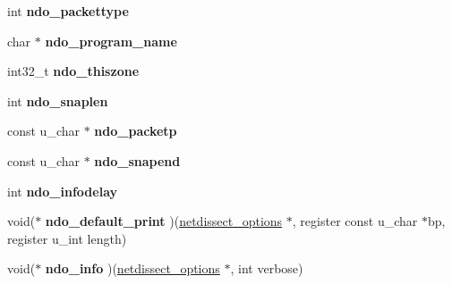 \begin{DoxyCompactItemize}
\item 
\hypertarget{structnetdissect__options_ada6900e4d98e413f6701f67e657f285d}{
int {\bfseries ndo\_\-packettype}}
\label{structnetdissect__options_ada6900e4d98e413f6701f67e657f285d}

\item 
\hypertarget{structnetdissect__options_a22c0eeff51bbc707974784deae68a89f}{
char $\ast$ {\bfseries ndo\_\-program\_\-name}}
\label{structnetdissect__options_a22c0eeff51bbc707974784deae68a89f}

\item 
\hypertarget{structnetdissect__options_a9ae704c2a6abe7ddaaaf50b6d3a272c3}{
int32\_\-t {\bfseries ndo\_\-thiszone}}
\label{structnetdissect__options_a9ae704c2a6abe7ddaaaf50b6d3a272c3}

\item 
\hypertarget{structnetdissect__options_a0b07f9aed05395e04fab0fadecffd8ab}{
int {\bfseries ndo\_\-snaplen}}
\label{structnetdissect__options_a0b07f9aed05395e04fab0fadecffd8ab}

\item 
\hypertarget{structnetdissect__options_a68ffbff8374a7962db26b78663e5e4c2}{
const u\_\-char $\ast$ {\bfseries ndo\_\-packetp}}
\label{structnetdissect__options_a68ffbff8374a7962db26b78663e5e4c2}

\item 
\hypertarget{structnetdissect__options_a37b348e415c5302c5f09701201220bb9}{
const u\_\-char $\ast$ {\bfseries ndo\_\-snapend}}
\label{structnetdissect__options_a37b348e415c5302c5f09701201220bb9}

\item 
\hypertarget{structnetdissect__options_af5e9ece2e631b7b4563619070fa88e67}{
int {\bfseries ndo\_\-infodelay}}
\label{structnetdissect__options_af5e9ece2e631b7b4563619070fa88e67}

\item 
\hypertarget{structnetdissect__options_a59c6dc70f55331d494282f47985ade7f}{
void($\ast$ {\bfseries ndo\_\-default\_\-print} )(\hyperlink{structnetdissect__options}{netdissect\_\-options} $\ast$, register const u\_\-char $\ast$bp, register u\_\-int length)}
\label{structnetdissect__options_a59c6dc70f55331d494282f47985ade7f}

\item 
\hypertarget{structnetdissect__options_a7ce2d7f21750436f416bdf3f27c62263}{
void($\ast$ {\bfseries ndo\_\-info} )(\hyperlink{structnetdissect__options}{netdissect\_\-options} $\ast$, int verbose)}
\label{structnetdissect__options_a7ce2d7f21750436f416bdf3f27c62263}


\end{DoxyCompactItemize}
